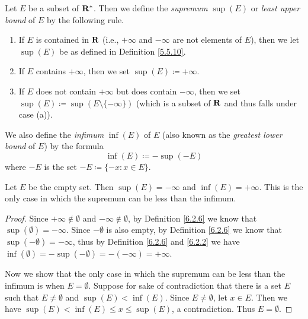 \begin{definition}\label{6.2.6}
    Let \(E\) be a subset of \(\mathbf{R}^*\).
    Then we define the \emph{supremum} \(\sup(E)\) or \emph{least upper bound} of \(E\) by the following rule.
    \begin{enumerate}
        \item If \(E\) is contained in \(\mathbf{R}\) (i.e., \(+\infty\) and \(-\infty\) are not elements of \(E\)), then we let \(\sup(E)\) be as defined in Definition \ref{5.5.10}.
        \item If \(E\) contains \(+\infty\), then we set \(\sup(E) \coloneqq +\infty\).
        \item If \(E\) does not contain \(+\infty\) but does contain \(-\infty\), then we set \(\sup(E) \coloneqq \sup(E \setminus \{-\infty\})\)
              (which is a subset of \(\mathbf{R}\) and thus falls under case (a)).
    \end{enumerate}
    We also define the \emph{infimum} \(\inf(E)\) of \(E\) (also known as the \emph{greatest lower bound} of \(E\)) by the formula
    \[
        \inf(E) \coloneqq -\sup(-E)
    \]
    where \(-E\) is the set \(-E \coloneqq \{-x : x \in E\}\).
\end{definition}

\setcounter{theorem}{9}
\begin{example}\label{6.2.10}
    Let \(E\) be the empty set.
    Then \(\sup(E) = -\infty\) and \(\inf(E) = +\infty\).
    This is the only case in which the supremum can be less than the infimum.
\end{example}

\begin{proof}
    Since \(+\infty \notin \emptyset\) and \(-\infty \notin \emptyset\), by Definition \ref{6.2.6} we know that \(\sup(\emptyset) = -\infty\).
    Since \(-\emptyset\) is also empty, by Definition \ref{6.2.6} we know that \(\sup(-\emptyset) = -\infty\), thus by Definition \ref{6.2.6} and \ref{6.2.2} we have \(\inf(\emptyset) = -\sup(-\emptyset) = -(-\infty) = +\infty\).

    Now we show that the only case in which the supremum can be less than the infimum is when \(E = \emptyset\).
    Suppose for sake of contradiction that there is a set \(E\) such that \(E \neq \emptyset\) and \(\sup(E) < \inf(E)\).
    Since \(E \neq \emptyset\), let \(x \in E\).
    Then we have \(\sup(E) < \inf(E) \leq x \leq \sup(E)\), a contradiction.
    Thus \(E = \emptyset\).
\end{proof}

